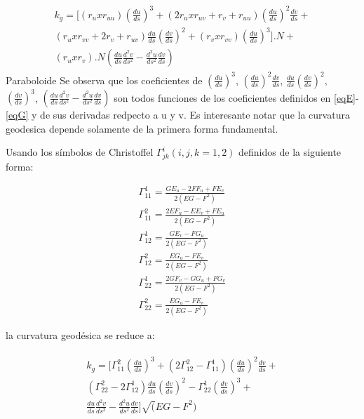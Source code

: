 \documentclass{endm}
\begin{document}
\begin{align} 
\begin{split}
k_g = [ 
(r_u x r_{uu}) (\frac{d u}{ds})^3 + 
(2 r_u x r_{uv} + r_v + r_{uu} ) (\frac{d u}{ds})^2 \frac{dv}{ds} + \\
(r_u x r_{vv} + 2 r_v + r_{uv})  \frac{d u}{ds} (\frac{d v}{ds})^2 + 
(r_v x r_{vv}) (\frac{d u}{ds})^3
] . N + \\
(r_u x r_{v}) . N (\frac{d u}{ds} \frac{d^2 v}{ds^2} - \frac{d^ 2 u}{ds^2 } \frac{d v}{ds})
\label{curvatura_conR}
\end{split}
\end{align}
Paraboloide 
Se observa que los coeficientes de $(\frac{d u}{ds})^3$, 
$(\frac{d u}{ds})^2 \frac{d v}{ds}$, $\frac{d u}{ds} (\frac{d v}{ds})^2$,  
$(\frac{d v}{ds})^3$,
$(\frac{d u}{ds} \frac{d^2 v}{ds^2} - \frac{d^2 u}{ds^2} \frac{d v}{ds} ) $
son todos funciones de los coeficientes definidos en \ref{eqE}-\ref{eqG} y de sus derivadas redpecto a u y v. Es interesante notar que la curvatura geodesica depende solamente de la primera forma fundamental.

Usando los s\'imbolos de Christoffel $\Gamma_{jk}^i (i,j,k=1,2)$ definidos de la siguiente forma:

\begin{align} 
\Gamma_{11}^1 = \frac{GE_u - 2 FF_u + FE_v}{2(EG - F^2)} \label{Gam_11_1}\\
\Gamma_{11}^2 = \frac{2EF_u - EE_v + FE_u}{2(EG - F^2)}\label{Gam_11_2}\\
\Gamma_{12}^1 = \frac{GE_v - FG_u}{2(EG - F^2)} \label{Gam_12_1}\\
\Gamma_{12}^2 = \frac{EG_u - FE_v}{2(EG - F^2)}\label{Gam_12_2}\\
\Gamma_{22}^1 = \frac{2GF_v - GG_u + FG_v}{2(EG - F^2)} \label{Gam_22_1}\\
\Gamma_{22}^2 = \frac{EG_u - FE_v}{2(EG - F^2)}\label{Gam_22_2}
\end{align}


la curvatura geod\'esica se reduce a:

\begin{align} 
\begin{split}
k_g = [ \Gamma_{11}^2 (\frac{du}{ds})^3 + (2 \Gamma_{12}^2 -  \Gamma_{11}^1 ) (\frac{du}{ds})^2 \frac{dv}{ds} +\\ (\Gamma_{22}^2 -  2 \Gamma_{12}^1 ) \frac{du}{ds} (\frac{dv}{ds})^2 - \Gamma_{22}^1 (\frac{dv}{ds})^3 +\\ \frac{du}{ds} \frac{d^2v}{ds^2} - \frac{d^2u}{ds^2} \frac{dv}{ds}] \sqrt(EG - F^2)
\label{eqCurvatura}
\end{split}
\end{align}
\end{document}
